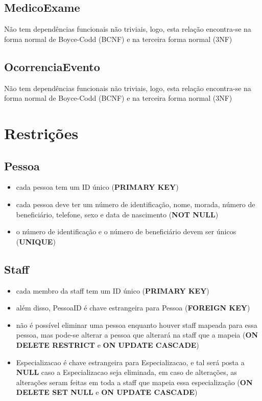 \documentclass[article, a4paper, 12pt, oneside]{memoir}
\begin{document}
\section*{MedicoExame}
Não tem dependências funcionais não triviais, logo, esta relação encontra-se na forma normal de Boyce-Codd (BCNF) e na terceira forma normal (3NF)

\section*{OcorrenciaEvento}
Não tem dependências funcionais não triviais, logo, esta relação encontra-se na forma normal de Boyce-Codd (BCNF) e na terceira forma normal (3NF)

\newpage
\chapter[Restrições][Restrições]{Restrições} \label{\thechapter}

\section*{Pessoa}
\begin{itemize}
	\item cada pessoa tem um ID único (\textbf{PRIMARY KEY})
	\item cada pessoa deve ter um número de identificação, nome, morada, número de beneficiário, telefone, sexo e data de nascimento (\textbf{NOT NULL})
	\item o número de identificação e o número de beneficiário devem ser únicos (\textbf{UNIQUE})
\end{itemize}

\section*{Staff}
\begin{itemize}
	\item cada membro da staff tem um ID único (\textbf{PRIMARY KEY})
	\item além disso, PessoaID é chave estrangeira para Pessoa (\textbf{FOREIGN KEY})
	\item não é possível eliminar uma pessoa enquanto houver staff mapeada para essa pessoa, mas pode-se alterar a pessoa que alterará na staff que a mapeia (\textbf{ON DELETE RESTRICT} e \textbf{ON UPDATE CASCADE})
	\item Especializacao é chave estrangeira para Especializacao, e tal será posta a \textbf{NULL} caso a Especializacao seja eliminada, em caso de alterações, as alterações seram feitas em toda a staff que mapeia essa especialização (\textbf{ON DELETE SET NULL} e \textbf{ON UPDATE CASCADE})
\end{itemize}
\end{document}
